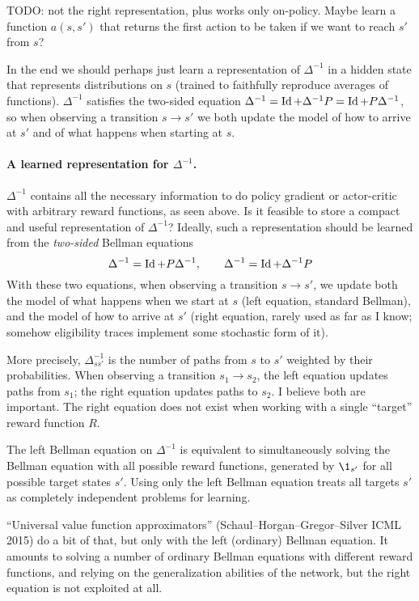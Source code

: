 \documentclass[11pt,a4paper]{article}
\begin{document}
TODO: not the right representation, plus works only on-policy. Maybe learn a function $a(s,s')$ that
returns the first action to be taken if we want to reach $s'$ from $s$?

In the end we should perhaps just learn a representation of $\Delta^{-1}$
in a hidden state that represents distributions on $s$ (trained to
faithfully reproduce averages of functions). $\Delta^{-1}$ satisfies the
two-sided equation $\Delta^{-1}=\operatorname{Id}+\Delta^{-1}P=\operatorname{Id}+P\Delta^{-1}$, so
when observing a transition $s\to s'$ we both update the model of
how to arrive at $s'$ and of what happens when starting at $s$.

\paragraph{A learned representation for $\Delta^{-1}$.} $\Delta^{-1}$
contains all the necessary information to do policy gradient or actor-critic with
arbitrary reward functions, as seen above. Is it feasible to store a
compact and useful representation of $\Delta^{-1}$? Ideally, such a
representation should be learned from the \emph{two-sided} Bellman
equations
\begin{equation}
\label{eq:greenbell}
\Delta^{-1}=\operatorname{Id} + P \Delta^{-1},\qquad \Delta^{-1}=\operatorname{Id} + \Delta^{-1}P
\end{equation}
With these two equations, when observing a transition $s\to s'$, we update
both the model of what happens when we start at $s$ (left equation,
standard Bellman), and the model of how to arrive at $s'$ (right
equation, rarely used as far as I know; somehow eligibility traces
implement some stochastic form of it).

More precisely, $\Delta^{-1}_{ss'}$ is the number of paths from $s$ to
$s'$ weighted by their probabilities. When observing a transition $s_1\to
s_2$, the left equation updates paths from $s_1$; the right equation
updates paths to $s_2$. I believe both are important. The right equation
does not exist when working with a single ``target'' reward function $R$.

The left Bellman equation on $\Delta^{-1}$ is equivalent to
simultaneously solving the Bellman equation with all possible reward
functions, generated by $\1_{s'}$ for all possible target states $s'$.
Using only the left Bellman equation treats all targets $s'$ as
completely independent problems for learning.

``Universal value function approximators'' (Schaul--Horgan--Gregor--Silver ICML 2015) do a bit of that, but only
with the left (ordinary) Bellman equation. It amounts to solving a number
of
ordinary Bellman equations with different reward functions, and relying on the generalization
abilities of the network, but the right equation is not exploited at all.
\end{document}
